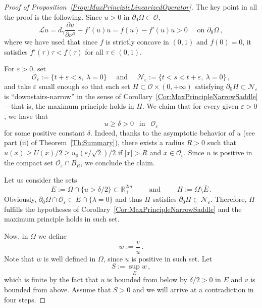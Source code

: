 \documentclass[12pt,reqno]{amsart}
\theoremstyle{definition}
\theoremstyle{remark}
\newcommand{\con}[1]{\mathbb{#1}}
\newcommand{\R}{\con{R}} %
\newcommand{\ocal}{\mathcal{O}}
\newcommand{\s}{\gamma}
\numberwithin{equation}{section}
\begin{document}
\begin{proof}[Proof of Proposition~\ref{Prop:MaxPrincipleLinearizedOperator}]
The key point in all the proof is the following. Since $u>0$ in $\partial_0\Omega \subset \ocal$, 
\begin{equation}
\label{Eq:uSupersolLinearized}
\mathscr{L}u = d_\s \dfrac{\partial u}{\partial \nu^a}  -f'(u) u = f(u) - f'(u) u > 0\quad \text{ on } \partial_0\Omega \,,
\end{equation}
where we have used that since $f$ is strictly concave in $(0,1)$ and $f(0)=0$, it satisfies $f'(\tau)\tau < f(\tau)$ for all $\tau\in (0,1)$.

For $\varepsilon > 0$, set
$$
\ocal_\varepsilon := \{t +\varepsilon < s,\ \lambda = 0 \} \quad \textrm{ and } \quad \mathcal{N}_\varepsilon := \{t < s < t+\varepsilon ,\ \lambda = 0 \}\,,
$$
and take $\varepsilon$ small enough so that each set $H \subset \ocal \times (0,+\infty)$ satisfying $\partial_0 H \subset \mathcal{N}_\varepsilon$  is ``downstairs-narrow'' in the sense of Corollary~\ref{Cor:MaxPrincipleNarrowSaddle} ---that is, the maximum principle holds in $H$. We claim that for every given $\varepsilon>0$, we have that
$$u \geq \delta >0\ \ \text{ in } \ \  \ocal_\varepsilon$$
for some positive constant $\delta$. Indeed, thanks to the asymptotic behavior of $u$ (see part (ii) of Theorem~\ref{Th:Summary}), there exists a radius $R>0$ such that $u(x) \geq U(x)/2 \geq u_0(\varepsilon/\sqrt{2})/2$ if $|x|>R$ and $x\in \ocal_\varepsilon$. Since $u$ is positive in the compact set $\overline{\ocal_\varepsilon} \cap \overline{B_R}$, we conclude the claim.

Let us consider the sets 
$$
E :=\Omega  \cap \{u > \delta/2\} \subset \R^{2m}_+ \qquad \textrm{ and } \qquad H := \Omega \setminus \overline{E}\,.
$$
Obviously, $\partial_0 \Omega \cap \ocal_\varepsilon \subset \overline{E} \cap \{\lambda = 0\}$ and thus $H$ satisfies $ \partial_0 H \subset \mathcal{N}_\varepsilon$. Therefore, $H$ fulfills the hypotheses of Corollary~\ref{Cor:MaxPrincipleNarrowSaddle} and the maximum principle holds in such set.


Now, in $\Omega$ we define
$$
w := \dfrac{v}{u}\,.
$$
Note that $w$ is well defined in $\Omega$, since $u$ is positive in such set. Let
$$
S := \sup_E w\,,
$$
which is finite by the fact that $u$ is bounded from below  by $\delta/2>0$ in $E$ and $v$ is bounded from above. Assume that $S > 0$ and we will arrive at a contradiction in four steps.


\end{proof}
\end{document}

